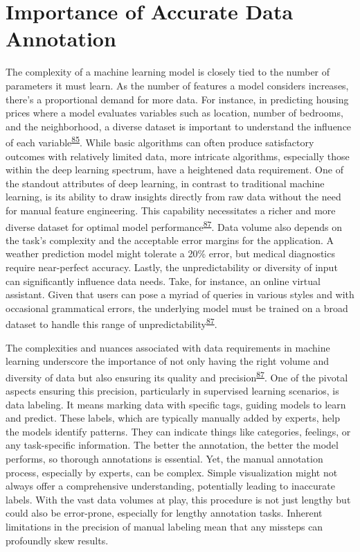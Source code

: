 \documentclass[
  10pt,
]{scrbook}
\begin{document}
\hypertarget{importance-of-accurate-data-annotation}{%
\section{Importance of Accurate Data
Annotation}\label{importance-of-accurate-data-annotation}}

The complexity of a machine learning model is closely tied to the number
of parameters it must learn. As the number of features a model considers
increases, there's a proportional demand for more data. For instance, in
predicting housing prices where a model evaluates variables such as
location, number of bedrooms, and the neighborhood, a diverse dataset is
important to understand the influence of each
variable\textsuperscript{\protect\hyperlink{ref-hastie01statisticallearning}{85}}.
While basic algorithms can often produce satisfactory outcomes with
relatively limited data, more intricate algorithms, especially those
within the deep learning spectrum, have a heightened data requirement.
One of the standout attributes of deep learning, in contrast to
traditional machine learning, is its ability to draw insights directly
from raw data without the need for manual feature engineering. This
capability necessitates a richer and more diverse dataset for optimal
model
performance\textsuperscript{\protect\hyperlink{ref-Goodfellow-et-al-2016}{87}}.
Data volume also depends on the task's complexity and the acceptable
error margins for the application. A weather prediction model might
tolerate a 20\% error, but medical diagnostics require near-perfect
accuracy. Lastly, the unpredictability or diversity of input can
significantly influence data needs. Take, for instance, an online
virtual assistant. Given that users can pose a myriad of queries in
various styles and with occasional grammatical errors, the underlying
model must be trained on a broad dataset to handle this range of
unpredictability\textsuperscript{\protect\hyperlink{ref-Goodfellow-et-al-2016}{87}}.

The complexities and nuances associated with data requirements in
machine learning underscore the importance of not only having the right
volume and diversity of data but also ensuring its quality and
precision\textsuperscript{\protect\hyperlink{ref-Goodfellow-et-al-2016}{87}}.
One of the pivotal aspects ensuring this precision, particularly in
supervised learning scenarios, is data labeling. It means marking data
with specific tags, guiding models to learn and predict. These labels,
which are typically manually added by experts, help the models identify
patterns. They can indicate things like categories, feelings, or any
task-specific information. The better the annotation, the better the
model performs, so thorough annotations is essential. Yet, the manual
annotation process, especially by experts, can be complex. Simple
visualization might not always offer a comprehensive understanding,
potentially leading to inaccurate labels. With the vast data volumes at
play, this procedure is not just lengthy but could also be error-prone,
especially for lengthy annotation tasks. Inherent limitations in the
precision of manual labeling mean that any missteps can profoundly skew
results.
\end{document}
